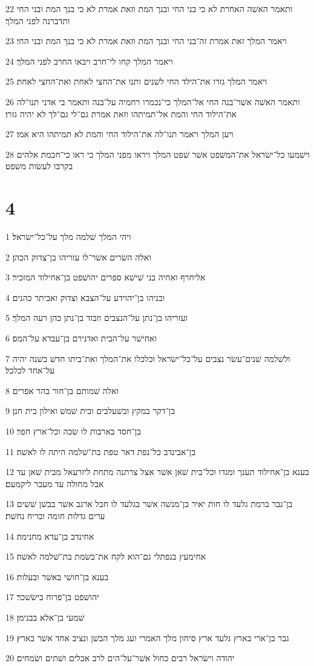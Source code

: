 \par 22 ותאמר האשׁה האחרת לא כי בני החי ובנך המת וזאת אמרת לא כי בנך המת ובני החי ותדברנה לפני המלך׃
\par 23 ויאמר המלך זאת אמרת זה־בני החי ובנך המת וזאת אמרת לא כי בנך המת ובני החי׃
\par 24 ויאמר המלך קחו לי־חרב ויבאו החרב לפני המלך׃
\par 25 ויאמר המלך גזרו את־הילד החי לשׁנים ותנו את־החצי לאחת ואת־החצי לאחת׃
\par 26 ותאמר האשׁה אשׁר־בנה החי אל־המלך כי־נכמרו רחמיה על־בנה ותאמר בי אדני תנו־לה את־הילוד החי והמת אל־תמיתהו וזאת אמרת גם־לי גם־לך לא יהיה גזרו׃
\par 27 ויען המלך ויאמר תנו־לה את־הילוד החי והמת לא תמיתהו היא אמו׃
\par 28 וישׁמעו כל־ישׂראל את־המשׁפט אשׁר שׁפט המלך ויראו מפני המלך כי ראו כי־חכמת אלהים בקרבו לעשׂות משׁפט׃

\chapter{4}

\par 1 ויהי המלך שׁלמה מלך על־כל־ישׂראל׃
\par 2 ואלה השׂרים אשׁר־לו עזריהו בן־צדוק הכהן׃
\par 3 אליחרף ואחיה בני שׁישׁא ספרים יהושׁפט בן־אחילוד המזכיר׃
\par 4 ובניהו בן־יהוידע על־הצבא וצדוק ואביתר כהנים׃
\par 5 ועזריהו בן־נתן על־הנצבים וזבוד בן־נתן כהן רעה המלך׃
\par 6 ואחישׁר על־הבית ואדנירם בן־עבדא על־המס׃
\par 7 ולשׁלמה שׁנים־עשׂר נצבים על־כל־ישׂראל וכלכלו את־המלך ואת־ביתו חדשׁ בשׁנה יהיה על־אחד לכלכל׃
\par 8 ואלה שׁמותם בן־חור בהר אפרים׃
\par 9 בן־דקר במקץ ובשׁעלבים ובית שׁמשׁ ואילון בית חנן׃
\par 10 בן־חסד בארבות לו שׂכה וכל־ארץ חפר׃
\par 11 בן־אבינדב כל־נפת דאר טפת בת־שׁלמה היתה לו לאשׁה׃
\par 12 בענא בן־אחילוד תענך ומגדו וכל־בית שׁאן אשׁר אצל צרתנה מתחת ליזרעאל מבית שׁאן עד אבל מחולה עד מעבר ליקמעם׃
\par 13 בן־גבר ברמת גלעד לו חות יאיר בן־מנשׁה אשׁר בגלעד לו חבל ארגב אשׁר בבשׁן שׁשׁים ערים גדלות חומה ובריח נחשׁת׃
\par 14 אחינדב בן־עדא מחנימה׃
\par 15 אחימעץ בנפתלי גם־הוא לקח את־בשׂמת בת־שׁלמה לאשׁה׃
\par 16 בענא בן־חושׁי באשׁר ובעלות׃
\par 17 יהושׁפט בן־פרוח בישׂשכר׃
\par 18 שׁמעי בן־אלא בבנימן׃
\par 19 גבר בן־ארי בארץ גלעד ארץ סיחון מלך האמרי ועג מלך הבשׁן ונציב אחד אשׁר בארץ׃
\par 20 יהודה וישׂראל רבים כחול אשׁר־על־הים לרב אכלים ושׁתים ושׂמחים׃

